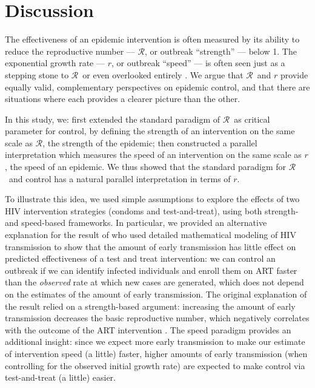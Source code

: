 \documentclass[12pt]{article}
\newcommand{\RR}{\ensuremath{{\mathcal R}}}
\begin{document}
\section{Discussion}

The effectiveness of an epidemic intervention is often measured by its ability to reduce the reproductive number --- \RR, or outbreak ``strength'' --- below 1. The exponential growth rate --- $r$, or outbreak ``speed'' --- is often seen just as a stepping stone to \RR\, or even overlooked entirely \citep{park2020reconciling}.
We argue that \RR\ and $r$ provide equally valid, complementary perspectives on epidemic control, and that there are situations where each provides a clearer picture than the other.

In this study, we:
first extended the standard paradigm of \RR\ as critical parameter for control, by defining the strength of an intervention on the same scale as \RR, the strength of the epidemic; 
then constructed a parallel interpretation which measures the speed of an intervention on the same scale as $r$, the speed of an epidemic.
We thus showed that the standard paradigm for \RR\ and control has a natural parallel interpretation in terms of $r$.

To illustrate this idea, we used simple assumptions to explore the effects of two HIV intervention strategies (condoms and test-and-treat), using both strength- and speed-based frameworks.
In particular, we provided an alternative explanation for the result of \cite{eaton2014proportion} who used detailed mathematical modeling of HIV transmission to show that the amount of early transmission has little effect on predicted effectiveness of a test and treat intervention:
we can control an outbreak if we can identify infected individuals and enroll them on ART faster than the \emph{observed} rate at which new cases are generated, which does not depend on the estimates of the amount of early transmission.
The original explanation of the result relied on a strength-based argument: increasing the amount of early transmission decreases the basic reproductive number, which negatively correlates with the outcome of the ART intervention \citep{eaton2014proportion}.
The speed paradigm provides an additional insight: since we expect more early transmission to make our estimate of intervention speed (a little) faster, higher amounts of early transmission (when controlling for the observed initial growth rate) are expected to make control via test-and-treat (a little) easier. 
\end{document}
